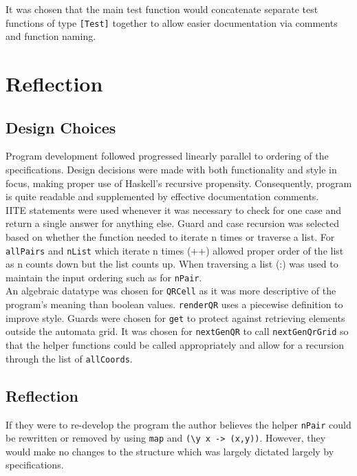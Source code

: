\documentclass[11pt]{article}
\begin{document}
   It was chosen that the main test function would concatenate separate test functions of type \verb|[Test]| together to allow easier documentation via comments and function naming. 



\section{Reflection}
    \subsection{Design Choices}
   Program development followed progressed linearly parallel to ordering of the specifications.  Design decisions were made with both functionality and style in focus, making proper use of Haskell's recursive propensity. Consequently, program is quite readable and supplemented by effective documentation comments.\\
   
   IITE statements were used whenever it was necessary to check for one case and return a single answer for anything else. Guard and case recursion was selected based on whether the function needed to iterate n times or traverse a list. For \verb|allPairs| and \verb|nList| which iterate n times (++) allowed proper order of the list as n counts down but the list counts up. When traversing a list (:) was used to maintain the input ordering such as for  \verb|nPair|. \\
   
   An algebraic datatype was chosen for \verb|QRCell| as it was more descriptive of the program's meaning than boolean values. \verb|renderQR| uses a piecewise definition to improve style. Guards were chosen for \verb|get| to protect against retrieving elements outside the automata grid.  It was chosen for \verb|nextGenQR| to call \verb|nextGenQrGrid| so that the helper functions could be called appropriately and allow for a recursion through the list of \verb|allCoords|.

   \subsection{Reflection}
   If they were to re-develop the program the author believes the helper  \verb|nPair| could be rewritten or removed by using \verb|map| and \verb|(\y x -> (x,y))|. However, they would make no changes to the structure which was largely dictated largely by specifications.\\
   
\end{document}
